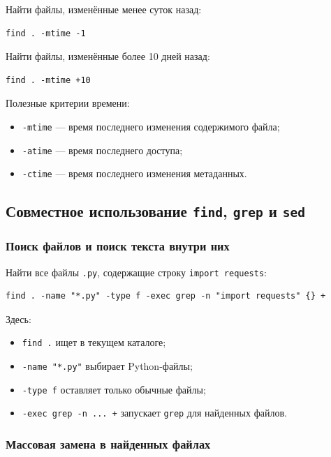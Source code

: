 \documentclass[12pt,a4paper]{article}
\begin{document}
Найти файлы, изменённые менее суток назад:

\begin{verbatim}
find . -mtime -1
\end{verbatim}

Найти файлы, изменённые более 10 дней назад:

\begin{verbatim}
find . -mtime +10
\end{verbatim}

Полезные критерии времени:

\begin{itemize}
    \item \texttt{-mtime} --- время последнего изменения содержимого файла;
    \item \texttt{-atime} --- время последнего доступа;
    \item \texttt{-ctime} --- время последнего изменения метаданных.
\end{itemize}

\subsection{Совместное использование \texttt{find}, \texttt{grep} и \texttt{sed}}

\subsubsection{Поиск файлов и поиск текста внутри них}

Найти все файлы \texttt{.py}, содержащие строку \texttt{import requests}:

\begin{verbatim}
find . -name "*.py" -type f -exec grep -n "import requests" {} +
\end{verbatim}

Здесь:

\begin{itemize}
    \item \texttt{find .} ищет в текущем каталоге;
    \item \texttt{-name "*.py"} выбирает Python-файлы;
    \item \texttt{-type f} оставляет только обычные файлы;
    \item \texttt{-exec grep -n ... {} +} запускает \texttt{grep} для найденных файлов.
\end{itemize}

\subsubsection{Массовая замена в найденных файлах}
\end{document}
